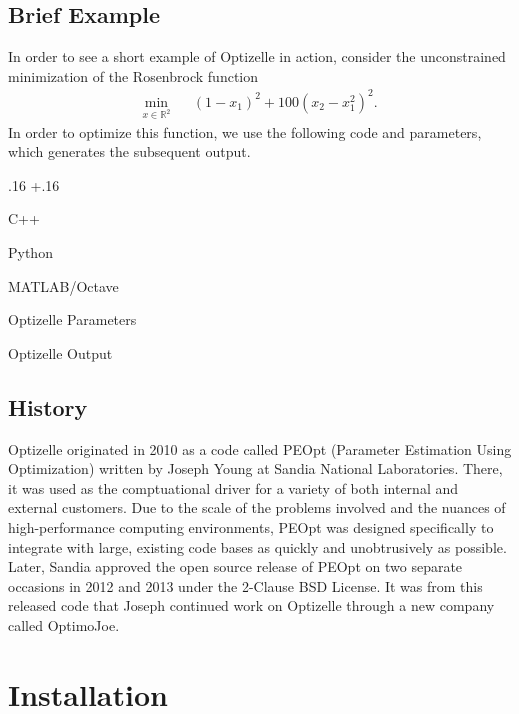 \documentclass{report}
\newenvironment{boldlist}
    {\begin{list}{}{
        \labelwidth.16\textwidth
        \leftmargin\dimexpr\leftmargin+.16\textwidth
        \renewcommand\makelabel[1]{%
            \textbf{##1}}}}
    {\vspace{-\dimexpr\baselineskip+2\itemsep}\end{list}}
\newcommand{\exampleitem}[2]{
    \item[Language] #1
    \item[Code] #2
    \item[]}
\newcommand{\re}{\mathbb{R}}
\begin{document}
\section{Brief Example}

        In order to see a short example of Optizelle in action, consider the unconstrained minimization of the Rosenbrock function
$$
    \begin{array}{rcl}
        \min\limits_{x\in\re^2} && (1-x_1)^2+100(x_2-x_1^2)^2.
    \end{array}
$$
In order to optimize this function, we use the following code and parameters, which generates the subsequent output.
\begin{boldlist}
    \exampleitem
        {C++}
        {}

    \exampleitem
        {Python}
        {}

    \exampleitem
        {MATLAB/Octave}
        {}

    \exampleitem
        {Optizelle Parameters}
        {}

    \exampleitem
        {Optizelle Output}
        {}
\end{boldlist}

\section{History}

        Optizelle originated in 2010 as a code called PEOpt (Parameter Estimation Using Optimization) written by Joseph Young at Sandia National Laboratories.  There, it was used as the comptuational driver for a variety of both internal and external customers.  Due to the scale of the problems involved and the nuances of high-performance computing environments, PEOpt was designed specifically to integrate with large, existing code bases as quickly and unobtrusively as possible.  Later, Sandia approved the open source release of PEOpt on two separate occasions in 2012 and 2013 under the 2-Clause BSD License.  It was from this released code that Joseph continued work on Optizelle through a new company called OptimoJoe.
        
\chapter{Installation}\label{ch:Install}
\end{document}
